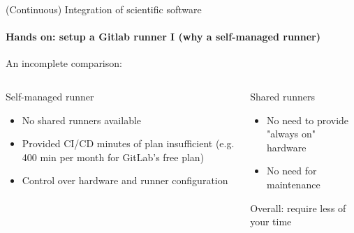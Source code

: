 \begin{frame}{(Continuous) Integration of scientific software}
    \framesubtitle{Hands on: setup a Gitlab runner I (why a self-managed runner)}
    An incomplete comparison:
    \begin{columns}
        \begin{column}{0.48\textwidth}
            \begin{exampleblock}{Self-managed runner}
                \begin{itemize}
                    \item No shared runners available
                    \item Provided CI/CD minutes of plan insufficient (e.g. 400 min per month for GitLab's free plan)
                    \item Control over hardware and runner configuration
                \end{itemize}
            \end{exampleblock}
        \end{column}

        \begin{column}{0.48\textwidth}
            \begin{block}{Shared runners}
                \begin{itemize}
                    \item No need to provide "always on" hardware
                    \item No need for maintenance
                \end{itemize}
                Overall: require less of your time
            \end{block}
        \end{column}
    \end{columns}
\end{frame}


